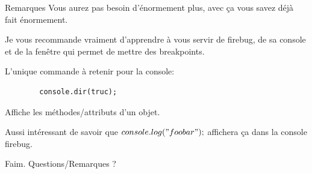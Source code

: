 \documentclass{beamer}
\begin{document}
\begin{frame}[fragile]{Remarques}
    Vous aurez pas besoin d'énormement plus, avec ça vous savez déjà fait énormement.

    \vspace{3mm}
    Je vous recommande vraiment d'apprendre à vous servir de firebug, de sa console et de la fenêtre qui permet de mettre des breakpoints.

    \vspace{3mm}
    L'unique commande à retenir pour la console:
    \begin{verbatim}
        console.dir(truc);
    \end{verbatim}
    Affiche les méthodes/attributs d'un objet.

    \vspace{3mm}
    Aussi intéressant de savoir que $console.log("foobar");$ affichera ça dans la console firebug.
\end{frame}

\begin{frame}[fragile]{}
\begin{LARGE}
\begin{center}
Faim. Questions/Remarques ?
\end{center}
\end{LARGE}
\end{frame}


\end{document}

